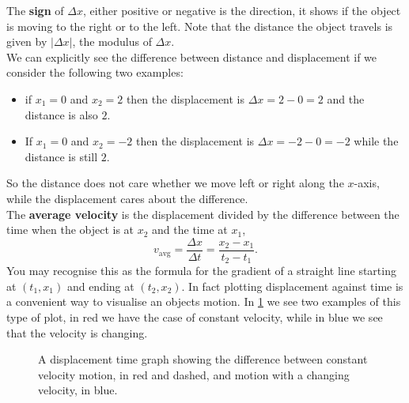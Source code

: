 \documentclass[a4paper,12pt]{book}
\begin{document}
The \textbf{sign} of $\Delta x$, either positive or negative is the direction, it shows if the object is moving to the right or to the left. Note that the distance the object travels is given by $\vert \Delta x\vert$, the modulus of $\Delta x$.\\

We can explicitly see the difference between distance and displacement if we consider the following two examples:
\begin{itemize}
\setlength{\itemsep}{-5pt}
    \item if $x_{1}=0$ and $x_{2}=2$ then the displacement is $\Delta x=2-0=2$ and the distance is also $2$.
    \item If $x_{1}=0$ and $x_{2}=-2$ then the displacement is $\Delta x = -2-0=-2$ while the distance is still $2$.
\end{itemize}
So the distance does not care whether we move left or right along the $x$-axis, while the displacement cares about the difference.\\

The \textbf{average velocity} is the displacement divided by the difference between the time when the object is at $x_{2}$ and the time at $x_{1}$,
\begin{equation}
    v_{\text{avg}}=\frac{\Delta x}{\Delta t}=\frac{x_{2}-x_{1}}{t_{2}-t_{1}}.
    \label{eq: average velocity}
\end{equation}
You may recognise this as the formula for the gradient of a straight line starting at $(t_{1},x_{1})$ and ending at $(t_{2},x_{2})$. In fact plotting displacement against time is a convenient way to visualise an objects motion. In \cref{fig: displacement time graph 1} we see two examples of this type of plot, in red we have the case of constant velocity, while in blue we see that the velocity is changing.\\

\begin{figure}[ht]
    \centering
    \caption{A displacement time graph showing the difference between constant velocity motion, in red and dashed, and motion with a changing velocity, in blue.}
    \label{fig: displacement time graph 1}
\end{figure}
\end{document}
